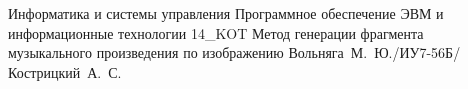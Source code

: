 \documentclass{bmstu}
\begin{document}
\makecourseworktitle
	{Информатика и системы управления} %
	{Программное обеспечение ЭВМ и информационные технологии} %
	{14\_KOT Метод генерации фрагмента музыкального произведения по изображению} %
	{Вольняга~М.~Ю./ИУ7-56Б/} %
	{Кострицкий~А.~С.} %
	{} %



\maketableofcontents





\makebibliography
\end{document}
